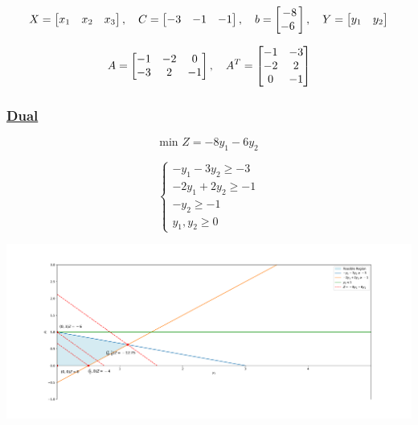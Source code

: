 \newpage
\[
X = \left[\begin{matrix} x_1 & x_2 & x_3 \end{matrix}\right], \hspace{0.35cm}
C = \left[\begin{matrix} -3 & -1 & -1 \end{matrix}\right], \hspace{0.35cm}
b = \left[\begin{matrix} -8 \\ -6 \ \end{matrix}\right], \hspace{0.35cm}
Y = \left[\begin{matrix} y_1 & y_2  \end{matrix}\right]
\]

\vspace{0.5cm}

\[
A = \left[\begin{matrix}   -1 & -2 & 0 \\
                           -3 & 2 & -1
                           \end{matrix}\right], \hspace{0.35cm}
        A^{T} = \left[\begin{matrix}  -1 & -3   \\
                                      -2 & 2 \\
                                      0 & -1 
                     \end{matrix}\right]
\]

\vspace{0.5cm}
\subsubsection*{\underline{Dual}}
\[\text{min } Z = -8y_1 - 6y_2 \]

\[
\left\{
\begin{array}{l}
    -y_{1} - 3y_{2} \geq -3 \\
    -2y_{1} + 2y_{2}  \geq -1 \\
     -y_{2}  \geq -1 \\
    y_{1}, y_{2}\geq 0
\end{array}
\right.
\]

\begin{center}
    \includegraphics[width=1\textwidth]{Exercices/ex1.1.pdf}
\end{center}

